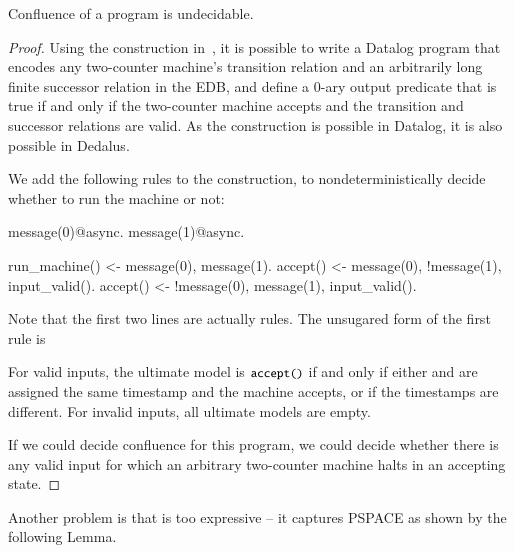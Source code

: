 \begin{lemma}
\label{lem:confluence-undecidable}
Confluence of a \lang program is undecidable.
\end{lemma}
\begin{proof}
Using the construction in~\cite{undecidable-datalog}, it is possible to write a Datalog program that encodes any two-counter machine's transition relation and an arbitrarily long finite successor relation in the EDB, and define a 0-ary output predicate  that is true if and only if the two-counter machine accepts and the transition and successor relations are valid.  As the construction is possible in Datalog, it is also possible in Dedalus.

We add the following rules to the construction, to nondeterministically decide whether to run the machine or not:

\begin{Dedalus}
message(0)@async.
message(1)@async.

run_machine() <- message(0), message(1).
accept() <- message(0), !message(1), input_valid().
accept() <- !message(0), message(1), input_valid().
\end{Dedalus}

Note that the first two lines are actually rules.  The unsugared form of the first rule is 

For valid inputs, the ultimate model is ${\dedalus{accept()}}$ if and only if either  and  are assigned the same timestamp and the machine accepts, or if the timestamps are different.  For invalid inputs, all ultimate models are empty.

If we could decide confluence for this program, we could decide whether there is any valid input for which an arbitrary two-counter machine halts in an accepting state.
\end{proof}


Another problem is that \lang is too expressive -- it captures PSPACE as shown by the following Lemma.

